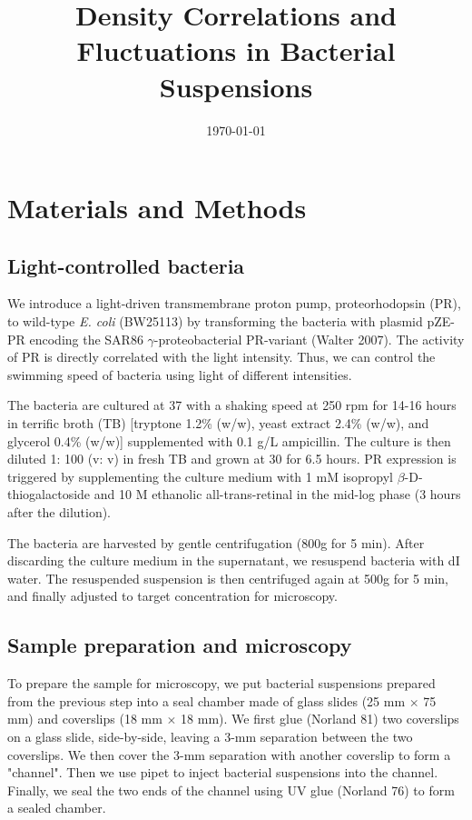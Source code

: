 \documentclass[preprint,aps,prl,amsmath,amssymb,longbibliography]{revtex4-2}
\title{Density Correlations and Fluctuations in Bacterial Suspensions}
\date{\today}
\begin{document}
\maketitle

\section{Materials and Methods}
\label{sec:method}
\subsection{Light-controlled bacteria}
We introduce a light-driven transmembrane proton pump, proteorhodopsin (PR), to wild-type \textit{E. coli} (BW25113) by transforming the bacteria with plasmid pZE-PR encoding the SAR86 $\gamma$-proteobacterial PR-variant (Walter 2007). The activity of PR is directly correlated with the light intensity. Thus, we can control the swimming speed of bacteria using light of different intensities.

The bacteria are cultured at 37 \textcelsius with a shaking speed at 250 rpm for 14-16 hours in terrific broth (TB) [tryptone 1.2\% (w/w), yeast extract 2.4\% (w/w), and glycerol 0.4\% (w/w)] supplemented with 0.1 g/L ampicillin. The culture is then diluted 1: 100 (v: v) in fresh TB and grown at 30 \textcelsius for 6.5 hours. PR expression is triggered by supplementing the culture medium with 1 mM isopropyl $\beta$-D-thiogalactoside and 10 \textmu M ethanolic all-trans-retinal in the mid-log phase (3 hours after the dilution).

The bacteria are harvested by gentle centrifugation (800g for 5 min). After discarding the culture medium in the supernatant, we resuspend bacteria with dI water. The resuspended suspension is then centrifuged again at 500g for 5 min, and finally adjusted to target concentration for microscopy.



\subsection{Sample preparation and microscopy}

To prepare the sample for microscopy, we put bacterial suspensions prepared from the previous step into a seal chamber made of glass slides (25 mm $\times$ 75 mm) and coverslips (18 mm $\times$ 18 mm). We first glue (Norland 81) two coverslips on a glass slide, side-by-side, leaving a 3-mm separation between the two coverslips. We then cover the 3-mm separation with another coverslip to form a "channel". Then we use pipet to inject bacterial suspensions into the channel. Finally, we seal the two ends of the channel using UV glue (Norland 76) to form a sealed chamber.
\end{document}
